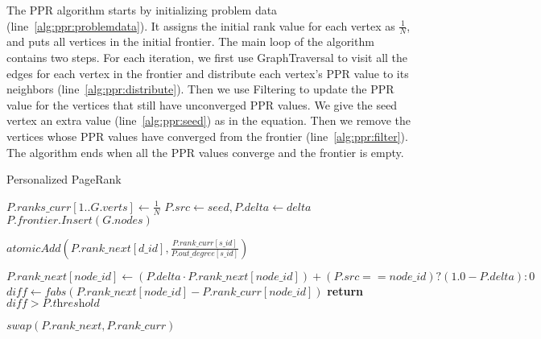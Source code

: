 \documentclass{article}
\begin{document}
The PPR algorithm starts by initializing problem data (line~\ref{alg:ppr:problemdata}). It assigns the initial rank value for each vertex as $\frac{1}{N}$, and puts all vertices in the initial frontier. The main loop of the algorithm contains two steps. For each iteration, we first use GraphTraversal to visit all the edges for each vertex in the frontier and distribute each vertex's PPR value to its neighbors (line~\ref{alg:ppr:distribute}). Then we use Filtering to update the PPR value for the vertices that still have unconverged PPR values. We give the seed vertex an extra value (line~\ref{alg:ppr:seed}) as in the equation. Then we remove the vertices whose PPR values have converged from the frontier (line~\ref{alg:ppr:filter}). The algorithm ends when all the PPR values converge and the frontier is empty.

\begin{algorithm}
\caption{Personalized PageRank} \label{alg:ppr}
  \begin{algorithmic}[1]
     \label{alg:ppr:problemdata}
      \State $P.\textit{ranks\_curr}[1..G.\textit{verts}] \gets \frac{1}{N}$
      \State $P.\textit{src} \gets \textit{seed}, P.\textit{delta} \gets \textit{delta}$
      \State $P.\textit{frontier.Insert}(G.\textit{nodes})$
    \EndProcedure

      \State $\textit{atomicAdd}(P.\textit{rank\_next}[d\_\textit{id}],\frac{P.\textit{rank\_curr}[s\_\textit{id}]}{P.\textit{out\_degree}[s\_\textit{id}]})$ \label{alg:ppr:distribute}
    \EndProcedure

      \State $P.\textit{rank}\_\textit{next}[\textit{node}\_\textit{id}] \gets (P.\textit{delta} \cdot P.\textit{rank}\_\textit{next}[\textit{node}\_\textit{id}]) + (P.\textit{src} == \textit{node}\_\textit{id}) ? (1.0 - P.\textit{delta}) : 0$ \label{alg:ppr:seed}
      \State $\textit{diff} \gets \textit{fabs}(P.\textit{rank\_next}[\textit{node\_id}]-P.\textit{rank\_curr}[\textit{node}\_\textit{id}])$
      \State \textbf{return} $\textit{diff} > P.\textit{threshold}$ \label{alg:ppr:filter}
    \EndProcedure

      \State {}
        \State {}
        \State {}
        \State $swap(P.\textit{rank\_next}, P.\textit{rank\_curr})$
      \EndWhile
    \EndProcedure
  \end{algorithmic}
\end{algorithm}
\end{document}
